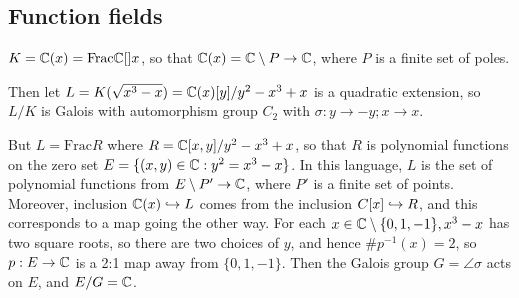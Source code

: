 \documentclass[10pt,a4paper]{article}
\begin{document}
\subsection*{Function fields}
$K = \mathbb{C}(x) = \text{Frac}\mathbb{C}[]x$, so that $\mathbb{C}(x) = \mathbb{C}\setminus P \to \mathbb{C}$, where $P$ is a finite set of poles.

Then let $L = K(\sqrt{x^3-x}) = \mathbb{C}(x)[y]/y^2-x^3+x$ is a quadratic extension, so $L/K$ is Galois with automorphism group $C_2$ with $\sigma:y \to -y; x\to x$.

But $L = \text{Frac}R$ where $R = \mathbb{C}[x,y]/y^2-x^3+x$, so that $R$ is polynomial functions on the zero set $E = \{(x,y)\in \mathbb{C} : y^2=x^3-x\}$. In this language, $L$ is the set of polynomial functions from $E \setminus P' \to \mathbb{C}$, where $P'$ is a finite set of points. Moreover, inclusion $\mathbb{C}(x) \hookrightarrow L$ comes from the inclusion $C[x] \hookrightarrow R$, and this corresponds to a map going the other way. For each $x \in \mathbb{C}\setminus\{0,1,-1\}, x^3-x$ has two square roots, so there are two choices of $y$, and hence $\#p^{-1}(x) = 2$, so $p:E\to \mathbb{C}$ is a 2:1 map away from $\{0,1,-1\}$. Then the Galois group $G = \angle{\sigma}$ acts on $E$, and $E/G = \mathbb{C}$.
\end{document}
